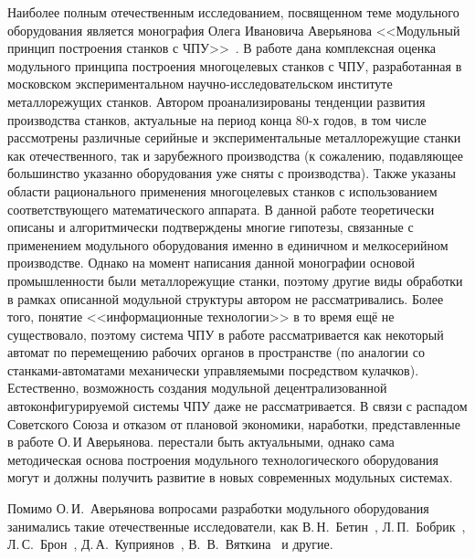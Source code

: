 Наиболее полным отечественным исследованием, посвященном теме модульного оборудования является монография Олега Ивановича Аверьянова <<Модульный принцип построения станков с ЧПУ>>~\cite{averianov}. В работе дана комплексная оценка модульного принципа построения многоцелевых станков с ЧПУ, разработанная в московском экспериментальном научно-исследовательском институте металлорежущих станков. Автором проанализированы тенденции развития производства станков, актуальные на период конца 80-х годов, в том числе рассмотрены различные серийные и экспериментальные металлорежущие станки как отечественного, так и зарубежного производства (к сожалению, подавляющее большинство указанно оборудования уже сняты с производства). Также указаны области рационального применения многоцелевых станков с использованием соответствующего математического аппарата. В данной работе теоретически описаны и алгоритмически подтверждены многие гипотезы, связанные с применением модульного оборудования именно в единичном и мелкосерийном производстве.  Однако на момент написания данной монографии основой промышленности были металлорежущие станки, поэтому другие виды обработки в рамках описанной модульной структуры автором не рассматривались. Более того, понятие <<информационные технологии>> в то время ещё не существовало, поэтому система ЧПУ в работе рассматривается как некоторый автомат по перемещению рабочих органов в пространстве (по аналогии со станками-автоматами механически управляемыми посредством кулачков). Естественно, возможность создания модульной децентрализованной автоконфигурируемой системы ЧПУ даже не рассматривается. В связи с распадом Советского Союза и отказом от плановой экономики, наработки, представленные в работе О.\,И Аверьянова. перестали быть актуальными, однако сама методическая основа построения модульного технологического оборудования могут и должны получить развитие в новых современных модульных системах.

Помимо О.\,И.~Аверьянова вопросами разработки модульного оборудования занимались такие отечественные исследователи, как В.\,Н.~Бетин~\cite{betin}, Л.\,П.~Бобрик~\cite{bobrik}, Л.\,С.~Брон~\cite{bron}, Д.\,А.~Куприянов~\cite{kuprianov}, В.~В.~Вяткина~\cite{minhat2009stepncmilluoa} и другие. 
	
